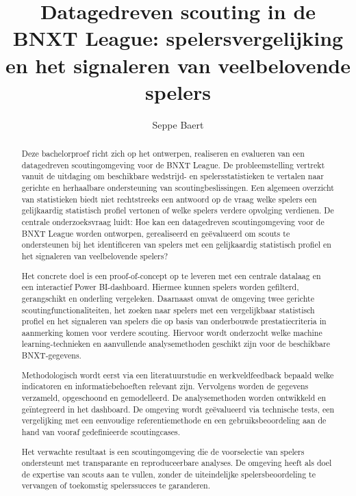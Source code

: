 \documentclass{hogent-article}
\title{Datagedreven scouting in de BNXT League: spelersvergelijking en het signaleren van veelbelovende spelers}
\author{Seppe Baert}
\begin{document}
\begin{abstract}
Deze bachelorproef richt zich op het ontwerpen, realiseren en evalueren van een datagedreven scoutingomgeving voor de BNXT League. De probleemstelling vertrekt vanuit de uitdaging om beschikbare wedstrijd- en spelersstatistieken te vertalen naar gerichte en herhaalbare ondersteuning van scoutingbeslissingen. Een algemeen overzicht van statistieken biedt niet rechtstreeks een antwoord op de vraag welke spelers een gelijkaardig statistisch profiel vertonen of welke spelers verdere opvolging verdienen. De centrale onderzoeksvraag luidt: Hoe kan een datagedreven scoutingomgeving voor de BNXT League worden ontworpen, gerealiseerd en geëvalueerd om scouts te ondersteunen bij het identificeren van spelers met een gelijkaardig statistisch profiel en het signaleren van veelbelovende spelers?

Het concrete doel is een proof-of-concept op te leveren met een centrale datalaag en een interactief Power BI-dashboard. Hiermee kunnen spelers worden gefilterd, gerangschikt en onderling vergeleken. Daarnaast omvat de omgeving twee gerichte scoutingfunctionaliteiten, het zoeken naar spelers met een vergelijkbaar statistisch profiel en het signaleren van spelers die op basis van onderbouwde prestatiecriteria in aanmerking komen voor verdere scouting. Hiervoor wordt onderzocht welke machine learning-technieken en aanvullende analysemethoden geschikt zijn voor de beschikbare BNXT-gegevens.

Methodologisch wordt eerst via een literatuurstudie en werkveldfeedback bepaald welke indicatoren en informatiebehoeften relevant zijn. Vervolgens worden de gegevens verzameld, opgeschoond en gemodelleerd. De analysemethoden worden ontwikkeld en geïntegreerd in het dashboard. De omgeving wordt geëvalueerd via technische tests, een vergelijking met een eenvoudige referentiemethode en een gebruiksbeoordeling aan de hand van vooraf gedefinieerde scoutingcases.

Het verwachte resultaat is een scoutingomgeving die de voorselectie van spelers ondersteunt met transparante en reproduceerbare analyses. De omgeving heeft als doel de expertise van scouts aan te vullen, zonder de uiteindelijke spelersbeoordeling te vervangen of toekomstig spelerssucces te garanderen.
\end{abstract}

\tableofcontents



\printbibliography[heading=bibintoc]
\end{document}
